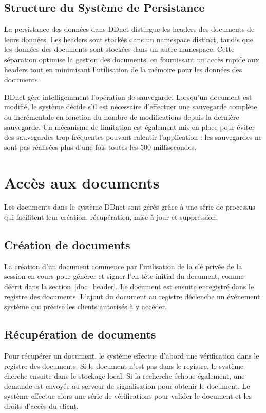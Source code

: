 \subsection{Structure du Système de Persistance}

La persistance des données dans DDnet distingue les headers des documents de leurs données. Les headers sont stockés dans un namespace distinct, tandis que les données des documents sont stockées dans un autre namespace. Cette séparation optimise la gestion des documents, en fournissant un accès rapide aux headers tout en minimisant l'utilisation de la mémoire pour les données des documents.

DDnet gère intelligemment l'opération de sauvegarde. Lorsqu'un document est modifié, le système décide s'il est nécessaire d'effectuer une sauvegarde complète ou incrémentale en fonction du nombre de modifications depuis la dernière sauvegarde. Un mécanisme de limitation est également mis en place pour éviter des sauvegardes trop fréquentes pouvant ralentir l'application : les sauvegardes ne sont pas réalisées plus d'une fois toutes les 500 millisecondes.

\section{Accès aux documents}

Les documents dans le système DDnet sont gérés grâce à une série de processus qui facilitent leur création, récupération, mise à jour et suppression.

\subsection{Création de documents}

La création d'un document commence par l'utilisation de la clé privée de la session en cours pour générer et signer l'en-tête initial du document, comme décrit dans la section~\ref{doc_header}. Le document est ensuite enregistré dans le registre des documents. L'ajout du document au registre déclenche un événement système qui précise les clients autorisés à y accéder.

\subsection{Récupération de documents}

Pour récupérer un document, le système effectue d'abord une vérification dans le registre des documents. Si le document n'est pas dans le registre, le système cherche ensuite dans le stockage local. Si la recherche échoue également, une demande est envoyée au serveur de signalisation pour obtenir le document. Le système effectue alors une série de vérifications pour valider le document et les droits d'accès du client.

